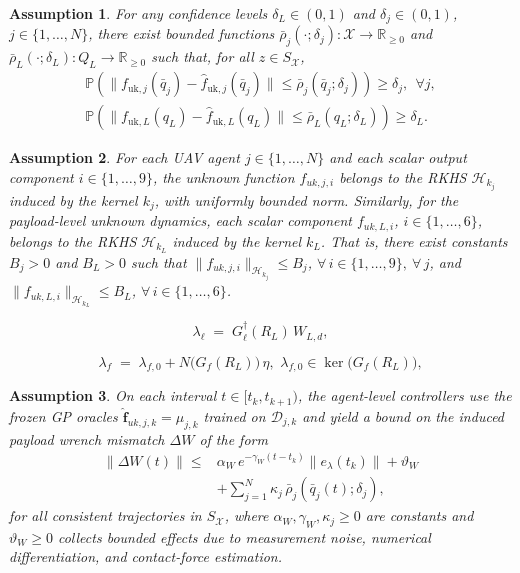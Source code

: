 \documentclass[10pt,a4paper]{amsart}
\newtheorem{assumption}{Assumption}
\begin{document}
\begin{assumption} \label{ass:oracle_bound}For any confidence levels $\delta_L\in(0,1)$ and
$\delta_j\in(0,1)$, $j\in\{1,\dots,N\}$, there exist bounded functions
$\bar\rho_j(\cdot;\delta_j):\mathcal{X}\to\mathbb{R}_{\ge 0}$ and
$\bar\rho_L(\cdot;\delta_L):Q_L\to\mathbb{R}_{\ge 0}$ such that, for all $z\in S_\mathcal{X}$,
\begin{align}
\mathbb{P}\!\left(\|f_{\mathrm{uk},j}(\bar q_j)-\hat f_{\mathrm{uk},j}(\bar q_j)\|
\le \bar\rho_j(\bar q_j;\delta_j)\right) \ge \delta_j,\ \ \forall j, \label{eq:ass2_agent}
\\
\mathbb{P}\!\left(\|f_{\mathrm{uk},L}(q_L)-\hat f_{\mathrm{uk},L}(q_L)\|
\le \bar\rho_L(q_L;\delta_L)\right) \ge \delta_L. \label{eq:ass2_payload}
\end{align}
\end{assumption}

\begin{assumption}
\label{ass:rkhs}
For each UAV agent $j\in\{1,\dots,N\}$ and each scalar output component $i\in\{1,\dots,9\}$,
the unknown function $f_{uk,j,i}$ belongs to the RKHS $\mathcal H_{k_j}$ induced by the kernel $k_j$,
with uniformly bounded norm.
Similarly, for the payload-level unknown dynamics, each scalar component $f_{uk,L,i}$, $i\in\{1,\dots,6\}$,
belongs to the RKHS $\mathcal H_{k_L}$ induced by the kernel $k_L$.
That is, there exist constants $B_j>0$ and $B_L>0$ such that $\|f_{uk,j,i}\|_{\mathcal H_{k_j}} \le B_j$, $\forall\, i\in\{1,\dots,9\},\ \forall\, j$, and $\|f_{uk,L,i}\|_{\mathcal H_{k_L}} \le B_L$, $\forall\, i\in\{1,\dots,6\}$.
\end{assumption}

\begin{equation}
\lambda_\ell \;=\; G_\ell^\dagger(R_L)\,W_{L,d},
\label{eq:leader_force}
\end{equation}

\begin{equation}
\lambda_f \;=\; \lambda_{f,0} + N\!\big(G_f(R_L)\big)\,\eta,
\,\,
\lambda_{f,0}\in\ker\!\big(G_f(R_L)\big),
\label{eq:follower_force}
\end{equation}

\begin{assumption}
\label{ass:agent_layer_iss}
On each interval $t\in[t_k,t_{k+1})$, the agent-level controllers use the frozen GP
oracles $\hat{\mathbf f}_{uk,j,k}=\mu_{j,k}$ trained on $\mathcal D_{j,k}$ and yield a bound
on the induced payload wrench mismatch $\Delta W$ of the form
\begin{align}
\|\Delta W(t)\|
\le&
\alpha_W\,e^{-\gamma_W(t-t_k)}\|e_\lambda(t_k)\|
+\vartheta_W\nonumber\\
&+\sum_{j=1}^N \kappa_{j}\,\bar\rho_j(\bar q_j(t);\delta_j),
\label{eq:DeltaW_bound_agentlayer}
\end{align}
for all consistent trajectories in $S_{\mathcal X}$, where $\alpha_W,\gamma_W,\kappa_j\ge 0$ are constants and
$\vartheta_W\ge 0$ collects bounded effects due to measurement noise, numerical differentiation, and contact-force estimation.
\end{assumption}
\end{document}
